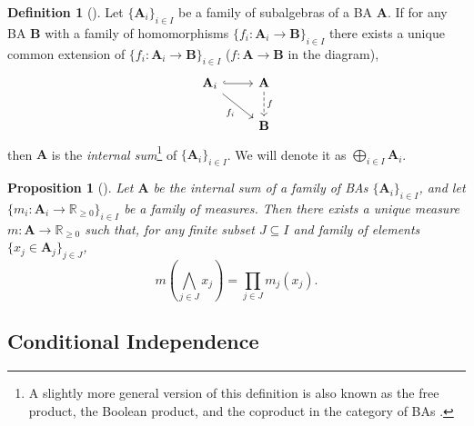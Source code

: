 \documentclass{article}
\newtheorem{proposition}[theorem]{Proposition}
\theoremstyle{definition}
\newtheorem{definition}[theorem]{Definition}
\theoremstyle{remark}
\begin{document}
\begin{definition}[\cite{givant2008introduction}]
  Let $\{ \mathbf{A}_i \}_{i \in I}$ be a family of subalgebras of a BA
  $\mathbf{A}$. If for any BA $\mathbf{B}$ with a family of homomorphisms $\{
  f_i\colon \mathbf{A}_i \to \mathbf{B} \}_{i \in I}$ there exists a unique
  common extension of $\{ f_i\colon \mathbf{A}_i \to \mathbf{B} \}_{i \in I}$
  ($f\colon \mathbf{A} \to \mathbf{B}$ in the diagram),
  \[
    \begin{tikzcd}
      \mathbf{A}_i \ar[r,hookrightarrow] \arrow{rd}[swap]{f_i} & \mathbf{A}
      \arrow[d,dashed,"f"] \\
      & \mathbf{B}
    \end{tikzcd}
  \]
  then $\mathbf{A}$ is the \emph{internal sum}\footnote{A slightly more general
    version of this definition is also known as the free product, the Boolean
    product, and the coproduct in the category of BAs
    \cite{givant2008introduction,koppelberg1989handbook,sikorski1969boolean}.}
  of $\{\mathbf{A}_i \}_{i \in I}$. We will denote it as $\bigoplus_{i \in I}
  \mathbf{A}_i$.
\end{definition}

\begin{proposition}[\cite{sikorski1969boolean}]
  Let $\mathbf{A}$ be the internal sum of a family of BAs $\{ \mathbf{A}_i \}_{i
    \in I}$, and let $\{m_i\colon \mathbf{A}_i \to \mathbb{R}_{\ge 0} \}_{i \in
    I}$ be a family of measures. Then there exists a unique measure $m\colon
  \mathbf{A} \to \mathbb{R}_{\ge 0}$ such that, for any finite subset $J
  \subseteq I$ and family of elements $\{ x_j \in \mathbf{A}_j \}_{j \in J}$,
  \[
    m \left( \bigwedge_{j \in J} x_j \right) = \prod_{j \in J} m_j(x_j).
  \]
\end{proposition}

\subsection{Conditional Independence}
\end{document}
